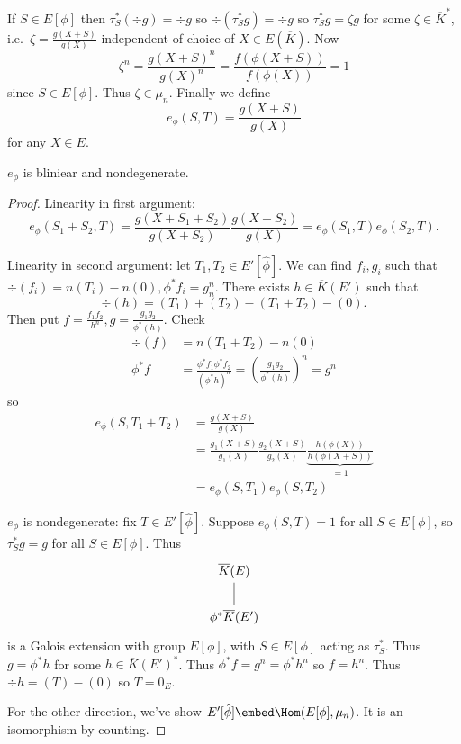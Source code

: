 \documentclass[a4paper]{article}
\theoremstyle{definition}
\theoremstyle{theorem}
\begin{document}
If \(S \in E[\phi]\) then \(\tau_S^*(\div g) = \div g\) so \(\div(\tau_S^* g) = \div g\) so \(\tau_S^* g = \zeta g\) for some \(\zeta \in \overline K^*\), i.e.\ \(\zeta = \frac{g(X + S)}{g(X)}\) independent of choice of \(X \in E(\overline K)\). Now
\[
  \zeta^n = \frac{g(X + S)^n}{g(X)^n} = \frac{f(\phi(X + S))}{f(\phi(X))} = 1
\]
since \(S \in E[\phi]\). Thus \(\zeta \in \mu_n\). Finally we define
\[
  e_\phi(S, T) = \frac{g(X + S)}{g(X)}
\]
for any \(X \in E\).

\begin{proposition}
  \(e_\phi\) is bliniear and nondegenerate.
\end{proposition}

\begin{proof}
  Linearity in first argument:
  \[
    e_\phi(S_1 + S_2, T) = \frac{g(X + S_1 + S_2)}{g(X + S_2)} \frac{g(X + S_2)}{g(X)} = e_\phi(S_1, T) e_\phi(S_2, T).
  \]

  Linearity in second argument: let \(T_1, T_2 \in E'[\hat \phi]\). We can find \(f_i, g_i\) such that \(\div (f_i) = n(T_i) - n(0), \phi^* f_i = g_n^n\). There exists \(h \in \overline K(E')\) such that
  \[
    \div (h) = (T_1) + (T_2) - (T_1 + T_2) - (0).
  \]
  Then put \(f = \frac{f_1f_2}{h^n}, g = \frac{g_1g_2}{\phi^*(h)}\). Check
  \begin{align*}
    \div (f) &= n(T_1 + T_2) - n(0) \\
    \phi^*f &= \frac{\phi^*f_1 \phi^* f_2}{(\phi^* h)^n} = \left(\frac{g_1g_2}{\phi^*(h)}\right)^n = g^n
  \end{align*}
  so
  \begin{align*}
    e_\phi(S, T_1 + T_2) &= \frac{g(X + S)}{g(X)} \\
                         &= \frac{g_1(X + S)}{g_1(X)} \frac{g_2(X + S)}{g_2(X)} \underbrace{\frac{h(\phi(X))}{h(\phi(X + S))}}_{= 1} \\
                         &= e_\phi(S, T_1) e_\phi(S, T_2)
  \end{align*}

  \(e_\phi\) is nondegenerate: fix \(T \in E'[\hat \phi]\). Suppose \(e_\phi(S, T) = 1\) for all \(S \in E[\phi]\), so \(\tau_S^*g = g\) for all \(S \in E[\phi]\). Thus
  \[
    \begin{tikzcd}
      \overline K(E) \ar[d, dash] \\
      \phi^*\overline K(E')
    \end{tikzcd}
  \]
  is a Galois extension with group \(E[\phi]\), with \(S \in E[\phi]\) acting as \(\tau_S^*\). Thus \(g = \phi^*h\) for some \(h \in \overline K(E')^*\). Thus \(\phi^*f = g^n = \phi^* h^n\) so \(f = h^n\). Thus \(\div h = (T) - (0)\) so \(T = 0_E\).

  For the other direction, we've show \(E'[\hat \phi] \embed \Hom(E[\phi], \mu_n)\). It is an isomorphism by counting.
\end{proof}
\end{document}
